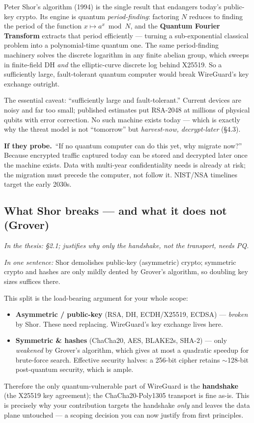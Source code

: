 \documentclass[11pt]{article}
\newcommand{\seethesis}[1]{%
  {\small\color{softgray}\textit{In the thesis: #1}}\par\vspace{3pt}}
\newcommand{\keyq}[1]{%
  \par\vspace{0.4em}%
  \noindent\colorbox{boxbg}{%
    \parbox{\dimexpr\textwidth-2\fboxsep}{%
      \small\textbf{\color{deepcyan}If they probe.}\ #1}}%
  \par\vspace{0.5em}}
\newcommand{\nutshell}[1]{\noindent\textit{In one sentence:} #1\par\vspace{4pt}}
\begin{document}
Peter Shor's algorithm (1994) is the single result that endangers today's
public-key crypto. Its engine is quantum \emph{period-finding}: factoring $N$
reduces to finding the period of the function $x \mapsto a^x \bmod N$, and the
\textbf{Quantum Fourier Transform} extracts that period efficiently --- turning a
sub-exponential classical problem into a polynomial-time quantum one. The same
period-finding machinery solves the discrete logarithm in any finite abelian
group, which sweeps in finite-field DH \emph{and} the elliptic-curve discrete log
behind X25519. So a sufficiently large, fault-tolerant quantum computer would
break WireGuard's key exchange outright.

The essential caveat: ``sufficiently large and fault-tolerant.'' Current devices
are noisy and far too small; published estimates put RSA-2048 at millions of
physical qubits with error correction. No such machine exists today --- which is
exactly why the threat model is not ``tomorrow'' but \emph{harvest-now,
decrypt-later} (\S4.3).

\keyq{``If no quantum computer can do this yet, why migrate now?'' Because
encrypted traffic captured today can be stored and decrypted later once the
machine exists. Data with multi-year confidentiality needs is already at risk;
the migration must precede the computer, not follow it. NIST/NSA timelines target
the early 2030s.}

\subsection{What Shor breaks --- and what it does not (Grover)}
\seethesis{\S2.1; justifies why only the handshake, not the transport, needs PQ.}
\nutshell{Shor demolishes public-key (asymmetric) crypto; symmetric crypto and
hashes are only mildly dented by Grover's algorithm, so doubling key sizes
suffices there.}

This split is the load-bearing argument for your whole scope:
\begin{itemize}
  \item \textbf{Asymmetric / public-key} (RSA, DH, ECDH/X25519, ECDSA) ---
  \emph{broken} by Shor. These need replacing. WireGuard's key exchange lives
  here.
  \item \textbf{Symmetric \& hashes} (ChaCha20, AES, BLAKE2s, SHA-2) --- only
  \emph{weakened} by Grover's algorithm, which gives at most a quadratic speedup
  for brute-force search. Effective security halves: a 256-bit cipher retains
  $\sim$128-bit post-quantum security, which is ample.
\end{itemize}
Therefore the only quantum-vulnerable part of WireGuard is the \textbf{handshake}
(the X25519 key agreement); the ChaCha20-Poly1305 transport is fine as-is. This
is precisely why your contribution targets the handshake \emph{only} and leaves
the data plane untouched --- a scoping decision you can now justify from first
principles.
\end{document}
